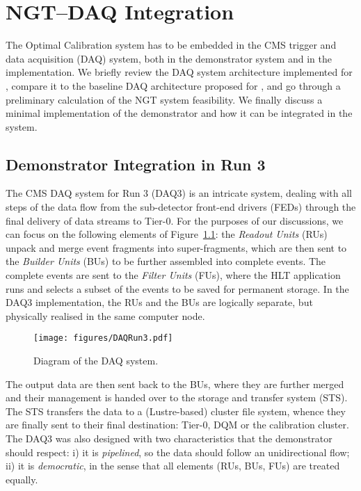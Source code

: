 \chapter{NGT--DAQ Integration} %


The Optimal Calibration system has to be embedded in the CMS trigger and data acquisition (DAQ) system,
both in the demonstrator system and in the \Phasetwo implementation.
We briefly review the DAQ system architecture implemented for \Runthree, 
compare it to the baseline DAQ architecture proposed for \Phasetwo, and 
go through a preliminary calculation of the NGT system feasibility.
We finally discuss a minimal implementation of the demonstrator and
how it can be integrated in the \Runthree system.

\section{Demonstrator Integration in Run 3}

The CMS DAQ system for Run 3 (DAQ3) is an intricate system, dealing with all steps of the data flow from the sub-detector front-end drivers (FEDs) through the final delivery of data streams to Tier-0. For the purposes of our discussions, we can focus on the following elements of Figure~\ref{fig:DAQ3}: 
the \emph{Readout Units} (RUs) unpack and merge event fragments into super-fragments, which are then sent to the \emph{Builder Units} (BUs) to be further assembled into complete events. 
The complete events are sent to the \emph{Filter Units} (FUs), where the HLT application runs and selects a subset of the events to be saved for permanent storage. 
In the DAQ3 implementation, the RUs and the BUs are logically separate, but physically realised in the same computer node.
\begin{figure}[htbp]
   \centering
	\texttt{[image: figures/DAQRun3.pdf]}
  \caption{Diagram of the \Runthree DAQ system.}
   \label{fig:DAQ3}
\end{figure}

The output data are then sent back to the BUs, where they are further merged and their management is handed over to the storage and transfer system (STS).
The STS  transfers the data to a (Lustre-based) cluster file system, whence they are finally sent to their final destination:
Tier-0,
DQM
or the calibration cluster.
The DAQ3 was also designed with two characteristics that the demonstrator should respect: 
i) it is \emph{pipelined}, so the data should follow an unidirectional flow;
ii) it is \emph{democratic}, in the sense that all elements (RUs, BUs, FUs) are treated equally.

